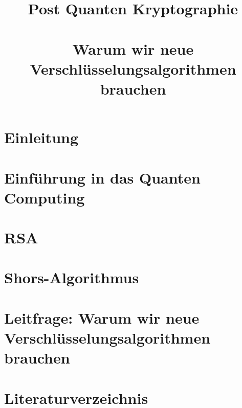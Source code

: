 \documentclass[conference]{IEEEtran}
\begin{document}

\title{Post Quanten Kryptographie\\
\large \ \\ \large Warum wir neue Verschlüsselungsalgorithmen brauchen}

\author{

  \and

}

\maketitle



\listoffigures
{}


\section{Einleitung}


\section{Einführung in das Quanten Computing}


\section{RSA}


\section{Shors-Algorithmus}


\section{Leitfrage: Warum wir neue Verschlüsselungsalgorithmen brauchen}



\section*{Literaturverzeichnis}
\printbibliography[heading=none]{}
\end{document}

